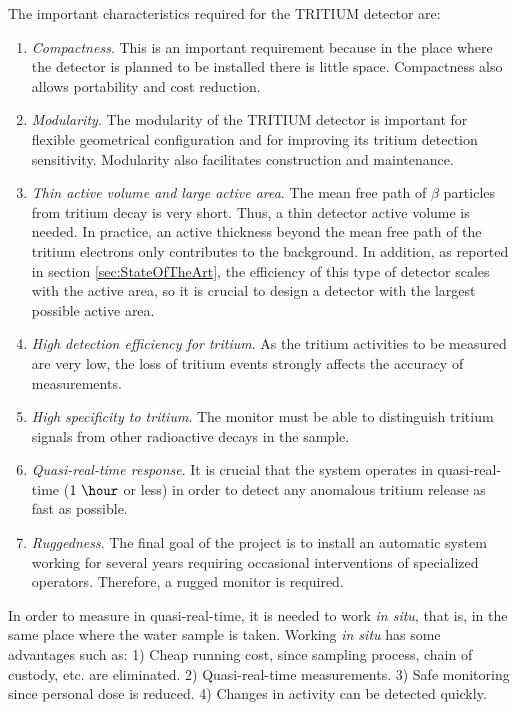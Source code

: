 The important characteristics required for the TRITIUM detector are:

\begin{enumerate}

\item{} \textit{Compactness}. This is an important requirement because in the place where the detector is planned to be installed there is little space. Compactness also allows portability and cost reduction.

\item{} \textit{Modularity}. The modularity of the TRITIUM detector is important for flexible geometrical configuration and for improving its tritium detection sensitivity. Modularity also facilitates construction and maintenance.

\item{} \textit{Thin active volume and large active area}. The mean free path of $\beta$ particles from tritium decay is very short. Thus, a thin detector active volume is needed. In practice, an active thickness beyond the mean free path of the tritium electrons only contributes to the background. In addition, as reported in section \ref{sec:StateOfTheArt}, the efficiency of this type of detector scales with the active area, so it is crucial to design a detector with the largest possible active area.

\item{} \textit{High detection efficiency for tritium}. As the tritium activities to be measured are very low, the loss of tritium events strongly affects the accuracy of measurements.

\item{} \textit{High specificity to tritium}. The monitor must be able to distinguish tritium signals from other radioactive decays in the sample.

\item{} \textit{Quasi-real-time response}. It is crucial that the system operates in quasi-real-time ($1~\hour$ or less) in order to detect any anomalous tritium release as fast as possible. 

\item{} \textit{Ruggedness}. The final goal of the project is to install an automatic system working for several years requiring occasional interventions of specialized operators. Therefore, a rugged monitor is required.

\end{enumerate}

In order to measure in quasi-real-time, it is needed to work \textit{in situ}, that is, in the same place where the water sample is taken. Working \textit{in situ} has some advantages such as: 1) Cheap running cost, since sampling process, chain of custody, etc. are eliminated. 2) Quasi-real-time measurements. 3) Safe monitoring since personal dose is reduced. 4) Changes in activity can be detected quickly.


